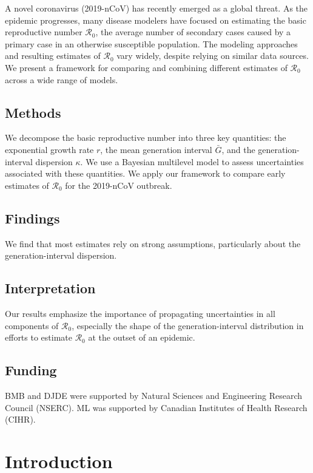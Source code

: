 \documentclass[12pt]{article}
\newcommand{\Ro}{\ensuremath{{\mathcal R}_{0}}\xspace}
\begin{document}
A novel coronavirus (2019-nCoV) has recently emerged as a global threat. 
As the epidemic progresses, many disease modelers have focused on estimating the basic reproductive number \Ro, the average number of secondary cases caused by a primary case in an otherwise susceptible population.
The modeling approaches and resulting estimates of \Ro vary widely, despite relying on similar data sources.
We present a framework for comparing and combining different estimates of \Ro across a wide range of models.

\subsection*{Methods}

We decompose the basic reproductive number into three key quantities: the exponential growth rate $r$, the mean generation interval $\bar G$, and the generation-interval dispersion $\kappa$.
We use a Bayesian multilevel model to assess uncertainties associated with these quantities.
We apply our framework to compare early estimates of \Ro for the 2019-nCoV outbreak.

\subsection*{Findings}

We find that most estimates rely on strong assumptions, particularly about the generation-interval dispersion.


\subsection*{Interpretation}

Our results emphasize the importance of propagating uncertainties in all components of \Ro, especially the shape of the generation-interval distribution in efforts to estimate \Ro at the outset of an epidemic.

\subsection*{Funding}

BMB and DJDE were supported by Natural Sciences and Engineering Research Council (NSERC). ML was supported by Canadian Institutes of Health Research (CIHR).

\pagebreak

\section{Introduction}
\end{document}
